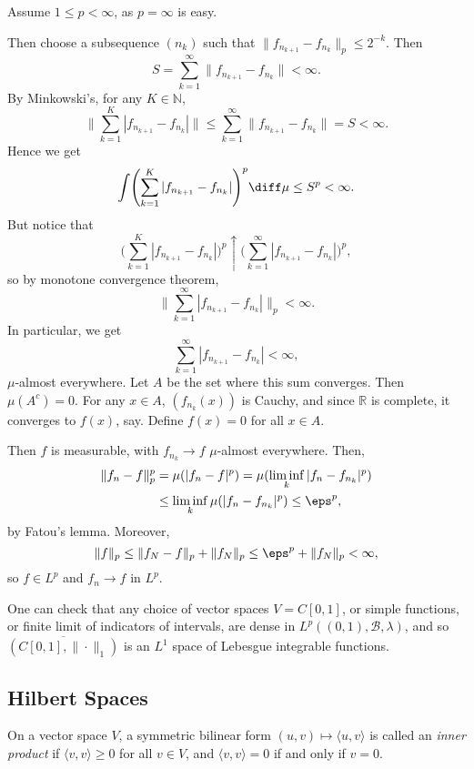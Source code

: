 \documentclass[12pt]{article}
\begin{document}
\begin{proofbox}
	Assume $1 \leq p < \infty$, as $p = \infty$ is easy.

	Then choose a subsequence $(n_k)$ such that $\|f_{n_{k+1}} - f_{n_k}\|_p \leq 2^{-k}$. Then
	\[
	S = \sum_{k = 1}^{\infty} \|f_{n_{k+1}} - f_{n_k}\| < \infty.
	\]
	By Minkowski's, for any $K \in \mathbb{N}$,
	\[
	\biggl\| \sum_{k = 1}^{K} |f_{n_{k+1}} - f_{n_k}| \biggr\| \leq \sum_{k = 1}^{\infty} \|f_{n_{k+1}} - f_{n_k} \| = S < \infty.
	\]
	Hence we get
	\[
	\int \Biggl( \sum_{k = 1}^{K} |f_{n_{k+1}} - f_{n_k}| \Biggr)^{p} \diff \mu \leq S^{p} < \infty.
	\]
	But notice that
	\[
	\Biggl( \sum_{k = 1}^{K} |f_{n_{k+1}} - f_{n_k}| \Biggr)^{p} \uparrow \Biggl( \sum_{k = 1}^{\infty} |f_{n_{k+1}} - f_{n_k}| \Biggr)^{p},
	\]
	so by monotone convergence theorem,
	\[
	\biggl\| \sum_{k = 1}^{\infty} |f_{n_{k+1}} - f_{n_k}| \biggr\|_{p} < \infty.
	\]
	In particular, we get
	\[
	\sum_{k = 1}^{\infty}|f_{n_{k+1}} - f_{n_k}| < \infty,
	\]
	$\mu$-almost everywhere. Let $A$ be the set where this sum converges. Then $\mu(A^{c}) = 0$. For any $x \in A$, $(f_{n_k}(x))$ is Cauchy, and since $\mathbb{R}$ is complete, it converges to $f(x)$, say. Define $f(x) = 0$ for all $x \in A$.

	Then $f$ is measurable, with $f_{n_k} \to f$ $\mu$-almost everywhere. Then,
	\begin{align*}
		\|f_n - f\|_p^p &= \mu(|f_n - f|^p) = \mu(\liminf_k |f_n - f_{n_k}|^{p}) \\
				&\leq \liminf_{k} \mu(|f_n - f_{n_k}|^p) \leq \eps^p,
	\end{align*}
	by Fatou's lemma. Moreover,
	\[
	\|f\|_p \leq \|f_N - f\|_p + \|f_N\|_p \leq \eps^{p} + \|f_N\|_p < \infty,
	\]
	so $f \in L^p$ and $f_n \to f$ in $L^p$.
\end{proofbox}

\begin{remark}
	One can check that any choice of vector spaces $V = C[0,1]$, or simple functions, or finite limit of indicators of intervals, are dense in $L^p((0,1), \mathcal{B}, \lambda)$, and so $\overline{(C[0,1], \|\cdot\|_1)}$ is an $L^1$ space of Lebesgue integrable functions.
\end{remark}

\subsection{Hilbert Spaces}
\label{sub:hilb}

On a vector space $V$, a symmetric bilinear form $(u, v) \mapsto \langle u, v \rangle$ is called an \emph{inner product} if $\langle v, v \rangle \geq 0$ for all $v \in V$, and $\langle v, v\rangle = 0$ if and only if $v = 0$.
\end{document}
